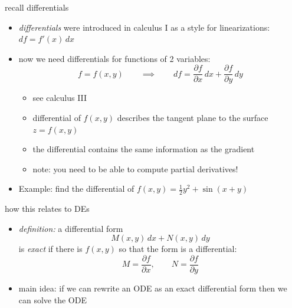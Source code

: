 \documentclass{beamer}
\begin{document}
\begin{frame}{recall differentials}

\begin{itemize}
\item \emph{differentials} were introduced in calculus I as a style for linearizations: $df = f'(x)\,dx$
\item now we need differentials for functions of 2 variables:
    $$f=f(x,y) \qquad \implies \qquad df = \frac{\partial f}{\partial x}\,dx + \frac{\partial f}{\partial y}\,dy$$

\vspace{-2mm}
    \begin{itemize}
    \item see calculus III
    \item differential of $f(x,y)$ describes the tangent plane to the surface $z=f(x,y)$
    \item the differential contains the same information as the gradient
    \item \alert{note:} you need to be able to compute partial derivatives!
    \end{itemize}
\item Example: find the differential of $f(x,y)=\frac{1}{2} y^2 + \sin(x+y)$

\vspace{20mm}
\end{itemize}
\end{frame}


\begin{frame}{how this relates to DEs}

\begin{itemize}
\item \emph{definition:}  a differential form
    $$M(x,y)\,dx + N(x,y)\,dy$$
is \alert{\emph{exact}} if there is $f(x,y)$ so that the form is a differential:
    $$M = \frac{\partial f}{\partial x}, \qquad N = \frac{\partial f}{\partial y}$$
\item \alert{main idea:} if we can rewrite an ODE as an exact differential form then we can solve the ODE
\end{itemize}
\end{frame}
\end{document}

